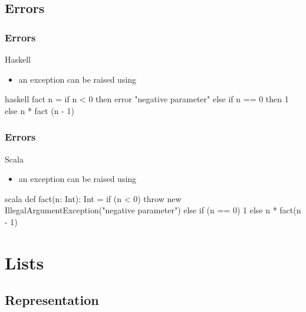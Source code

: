 \documentclass[dvipsnames]{beamer}
\theoremstyle{plain}
\begin{document}
\subsection{Errors}

\begin{frame}[fragile]
  \frametitle{Errors}

  \begin{block}{Haskell}
    \begin{itemize}
      \item an exception can be raised using 
    \end{itemize}
  \end{block}

  \begin{example}[factorial]
    \begin{pygments}{haskell}
fact n =
    if n < 0
    then error "negative parameter"
    else if n == 0
         then 1
         else n * fact (n - 1)
    \end{pygments}
  \end{example}
\end{frame}

\begin{frame}[fragile]
  \frametitle{Errors}

  \begin{block}{Scala}
    \begin{itemize}
      \item an exception can be raised using 
    \end{itemize}
  \end{block}

  \begin{example}[factorial]
    \begin{pygments}{scala}
def fact(n: Int): Int =
    if (n < 0) throw
        new IllegalArgumentException("negative parameter")
    else if (n == 0) 1
         else n * fact(n - 1)
    \end{pygments}
  \end{example}
\end{frame}

\section{Lists}

\subsection{Representation}
\end{document}
